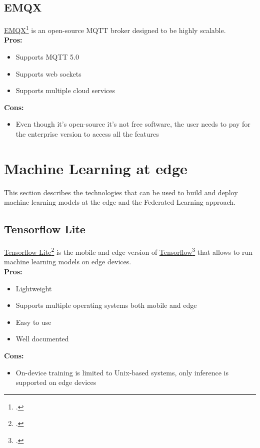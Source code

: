 \subsection{EMQX}
\label{emqx}
\href{https://www.emqx.io/}{EMQX}\footcite{site:emqx} is an open-source MQTT broker designed to be highly scalable.\\
\textbf{Pros:}
\begin{itemize}
    \item Supports MQTT 5.0
    \item Supports web sockets
    \item Supports multiple cloud services
\end{itemize}
\textbf{Cons:}
\begin{itemize}
    \item Even though it's open-source it's not free software, the user needs to pay for the enterprise version to access all the features
\end{itemize}

\section{Machine Learning at edge} 
This section describes the technologies that can be used to build and deploy machine learning models at the edge and the Federated Learning approach.

\subsection{Tensorflow Lite}
\label{tensorflow-lite}
\href{https://www.tensorflow.org/lite}{Tensorflow Lite}\footcite{site:tflite} is the mobile and edge version of \href{https://www.tensorflow.org/}{Tensorflow}\footcite{site:tensorflow} that allows to run machine learning models on edge devices.\\
\textbf{Pros:}
\begin{itemize}
    \item Lightweight
    \item Supports multiple operating systems both mobile and edge
    \item Easy to use
    \item Well documented
\end{itemize}
\textbf{Cons:}
\begin{itemize}
    \item On-device training is limited to Unix-based systems, only inference is supported on edge devices
\end{itemize}

